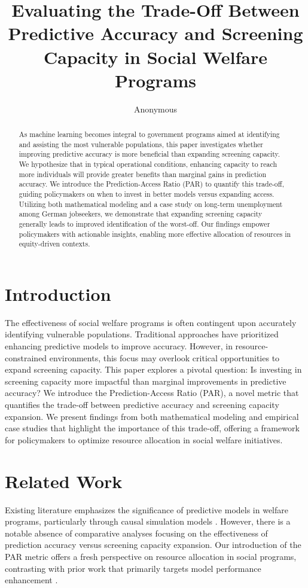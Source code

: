 \documentclass{article} %
\title{
Evaluating the Trade-Off Between Predictive Accuracy and Screening Capacity in Social Welfare Programs
}
\author{Anonymous}
\begin{document}
\maketitle

\begin{abstract}
As machine learning becomes integral to government programs aimed at identifying and assisting the most vulnerable populations, this paper investigates whether improving predictive accuracy is more beneficial than expanding screening capacity. We hypothesize that in typical operational conditions, enhancing capacity to reach more individuals will provide greater benefits than marginal gains in prediction accuracy. We introduce the Prediction-Access Ratio (PAR) to quantify this trade-off, guiding policymakers on when to invest in better models versus expanding access. Utilizing both mathematical modeling and a case study on long-term unemployment among German jobseekers, we demonstrate that expanding screening capacity generally leads to improved identification of the worst-off. Our findings empower policymakers with actionable insights, enabling more effective allocation of resources in equity-driven contexts.
\end{abstract}

\section{Introduction}
The effectiveness of social welfare programs is often contingent upon accurately identifying vulnerable populations. Traditional approaches have prioritized enhancing predictive models to improve accuracy. However, in resource-constrained environments, this focus may overlook critical opportunities to expand screening capacity. This paper explores a pivotal question: Is investing in screening capacity more impactful than marginal improvements in predictive accuracy? We introduce the Prediction-Access Ratio (PAR), a novel metric that quantifies the trade-off between predictive accuracy and screening capacity expansion. We present findings from both mathematical modeling and empirical case studies that highlight the importance of this trade-off, offering a framework for policymakers to optimize resource allocation in social welfare initiatives.

\section{Related Work}
Existing literature emphasizes the significance of predictive models in welfare programs, particularly through causal simulation models \cite{irfiansyah2023implementationom, orhan2024computationalmm}. However, there is a notable absence of comparative analyses focusing on the effectiveness of prediction accuracy versus screening capacity expansion. Our introduction of the PAR metric offers a fresh perspective on resource allocation in social programs, contrasting with prior work that primarily targets model performance enhancement \cite{merluzzi2021wirelessem, ordonez2025intelligentec}.
\end{document}
